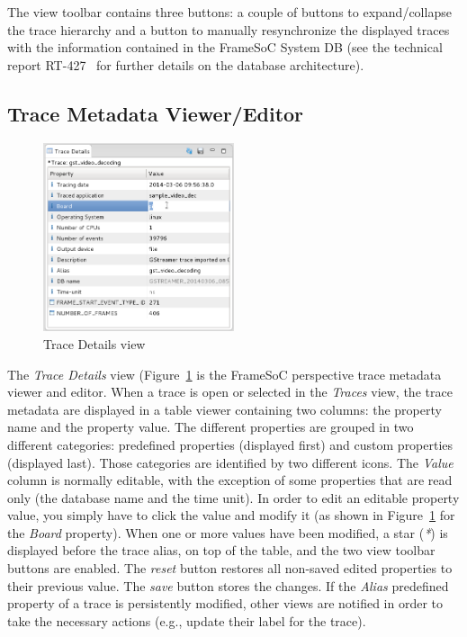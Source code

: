 \documentclass[twoside]{article}
\begin{document}
\begin{sloppypar}
The view toolbar contains three buttons: a couple of buttons to expand/collapse the trace hierarchy and a button to manually resynchronize the displayed traces with the information contained in the FrameSoC System DB (see the technical report RT-427~\cite{pagano:hal} for further details on the database architecture).

\subsection{Trace Metadata Viewer/Editor}
\label{subsec:metadata}

\begin{figure}[H]
  \centering
    \includegraphics[width=0.5\textwidth]{images/metadata_editing.png}
  \caption{Trace Details view}
  \label{fig:metadata_editing}
\end{figure}

The \emph{Trace Details} view (Figure~\ref{fig:metadata_editing} is the FrameSoC perspective trace metadata viewer and editor.
When a trace is open or selected in the \emph{Traces} view, the trace metadata are displayed in a table viewer containing two columns: the property name and the property value. 
The different properties are grouped in two different categories: predefined properties (displayed first) and custom properties (displayed last). 
Those categories are identified by two different icons.
The \emph{Value} column is normally editable, with the exception of some properties that are read only (the database name and the time unit).
In order to edit an editable property value, you simply have to click the value and modify it (as shown in Figure~\ref{fig:metadata_editing} for the \emph{Board} property).
When one or more values have been modified, a star (\emph{*}) is displayed before the trace alias, on top of the table, and the two view toolbar buttons are enabled. 
The \emph{reset} button restores all non-saved edited properties to their previous value.
The \emph{save} button stores the changes.
If the \emph{Alias} predefined property of a trace is persistently modified, other views are notified in order to take the necessary actions (e.g., update their label for the trace).


\end{sloppypar}
\end{document}
